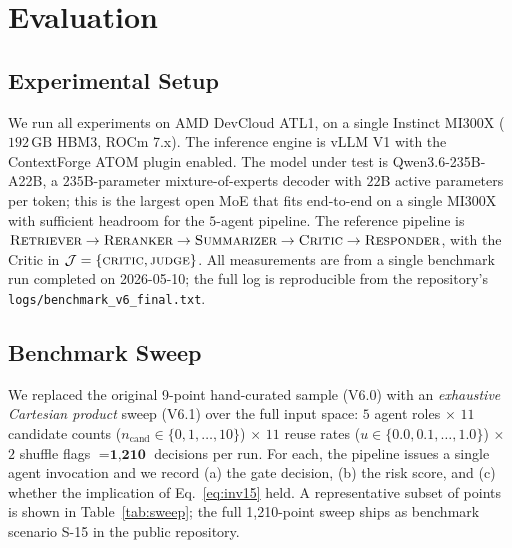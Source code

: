 \documentclass[10pt,twocolumn]{article}
\newcommand{\Judge}{\mathcal{J}}
\newcommand{\Cand}{n_{\text{cand}}}
\newcommand{\Reuse}{u}
\newcommand{\code}[1]{\texttt{\small #1}}
\begin{document}
\section{Evaluation}
\label{sec:eval}

\subsection{Experimental Setup}
\label{sec:eval:setup}

We run all experiments on AMD DevCloud ATL1, on a single Instinct MI300X
($192\,\mathrm{GB}$ HBM3, ROCm 7.x). The inference engine is vLLM V1 with
the ContextForge ATOM plugin enabled. The model under test is
Qwen3.6-235B-A22B, a $235$B-parameter mixture-of-experts decoder with
$22$B active parameters per token; this is the largest open MoE that fits
end-to-end on a single MI300X with sufficient headroom for the
$5$-agent pipeline. The reference pipeline is
$\textsc{Retriever} \to \textsc{Reranker} \to \textsc{Summarizer} \to
\textsc{Critic} \to \textsc{Responder}$, with the Critic in
$\Judge = \{\textsc{critic}, \textsc{judge}\}$. All measurements are from
a single benchmark run completed on 2026-05-10; the full log is reproducible
from the repository's \code{logs/benchmark\_v6\_final.txt}.

\subsection{Benchmark Sweep}
\label{sec:eval:sweep}

We replaced the original 9-point hand-curated sample (V6.0) with an
\emph{exhaustive Cartesian product} sweep (V6.1) over the full input
space: $5$ agent roles $\times$ $11$ candidate counts ($\Cand \in
\{0, 1, \ldots, 10\}$) $\times$ $11$ reuse rates ($\Reuse \in
\{0.0, 0.1, \ldots, 1.0\}$) $\times$ $2$ shuffle flags $=
\textbf{1{,}210}$ decisions per run. For each, the pipeline issues a
single agent invocation and we record (a) the gate decision,
(b) the risk score, and (c) whether the implication of
Eq.~\ref{eq:inv15} held. A representative subset of points is shown
in Table~\ref{tab:sweep}; the full 1{,}210-point sweep ships as
benchmark scenario S-15 in the public repository.
\end{document}

